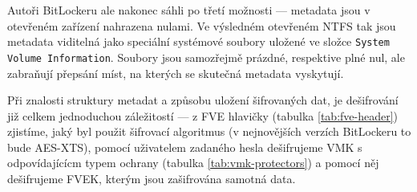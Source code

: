 Autoři BitLockeru ale nakonec sáhli po třetí možnosti --- metadata jsou v otevřeném zařízení nahrazena nulami. Ve výsledném otevřeném NTFS tak jsou metadata viditelná jako speciální systémové soubory uložené ve složce \texttt{System Volume Information}. Soubory jsou samozřejmě prázdné, respektive plné nul, ale zabraňují přepsání míst, na kterých se skutečná metadata vyskytují.


Při znalosti struktury metadat a způsobu uložení šifrovaných dat, je dešifrování již celkem jednoduchou záležitostí --- z FVE hlavičky (tabulka \ref{tab:fve-header}) zjistíme, jaký byl použit šifrovací algoritmus (v nejnovějších verzích BitLockeru to bude AES-XTS), pomocí uživatelem zadaného hesla dešifrujeme VMK s odpovídajícícm typem ochrany (tabulka \ref{tab:vmk-protectors}) a pomocí něj dešifrujeme FVEK, kterým jsou zašifrována samotná data.


